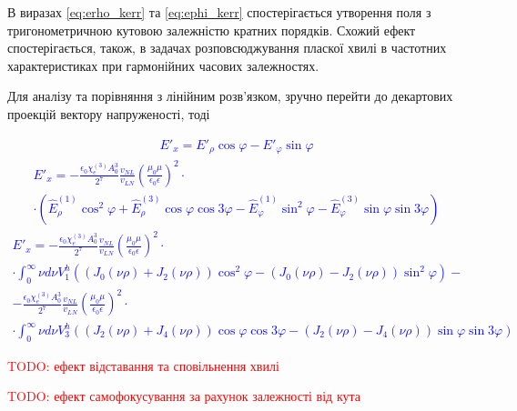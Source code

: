 В виразах \eqref{eq:erho_kerr} та \eqref{eq:ephi_kerr} спостерігається
утворення поля з тригонометричною кутовою залежністю кратних порядків.
Схожий ефект спостерігається, також, в задачах розповсюджування пласкої 
хвилі в частотних характеристиках при гармонійних часових залежностях.


Для аналізу та порівняння з лінійним розв'язком, зручно перейти до 
декартових проекцій вектору напруженості, тоді

\textcolor{blue} { \begin{equation*} \begin{aligned}
E'_x = E'_\rho \cos \varphi - E'_\varphi \sin \varphi
\end{aligned} \end{equation*} }
%
\textcolor{blue} { \begin{equation*} \begin{aligned}
E'_x = - \frac{\epsilon_0 \chi_e^{(3)} A_0^3}{2^7} \frac{v_{NL}}{v_{LN}}
\left( \frac{\mu_0 \mu}{\epsilon_0 \epsilon} \right)^2 \cdot \\ \cdot
\left(\hat{E}_\rho^{(1)} \cos^2 \varphi +
\hat{E}_\rho^{(3)} \cos \varphi \cos 3 \varphi - 
\hat{E}_\varphi^{(1)} \sin^2 \varphi -
\hat{E}_\varphi^{(3)} \sin \varphi \sin 3 \varphi \right)
\end{aligned} \end{equation*} }
%
\textcolor{blue} { \begin{equation*} \begin{aligned}
E'_x = - \frac{\epsilon_0 \chi_e^{(3)} A_0^3}{2^7} \frac{v_{NL}}{v_{LN}}
\left( \frac{\mu_0 \mu}{\epsilon_0 \epsilon} \right)^2 \cdot \\ \cdot
\int_0^\infty \nu d \nu V_1^h \left( 
\left( J_0 (\nu \rho) + J_2 (\nu \rho) \right) \cos^2 \varphi -
\left( J_0 (\nu \rho) - J_2 (\nu \rho) \right) \sin^2 \varphi \right) - \\
- \frac{\epsilon_0 \chi_e^{(3)} A_0^3}{2^7} \frac{v_{NL}}{v_{LN}}
\left( \frac{\mu_0 \mu}{\epsilon_0 \epsilon} \right)^2 \cdot \\ \cdot
\int_0^\infty \nu d \nu V_3^h \left( 
\left( J_2 (\nu \rho) + J_4 (\nu \rho) \right) \cos \varphi \cos 3 \varphi -
\left( J_2 (\nu \rho) - J_4 (\nu \rho) \right) \sin \varphi \sin 3 \varphi 
\right)
\end{aligned} \end{equation*} }

\textcolor{red} {TODO: ефект відставання та сповільнення хвилі}

\textcolor{red} {TODO: ефект самофокусування за рахунок залежності від кута}

